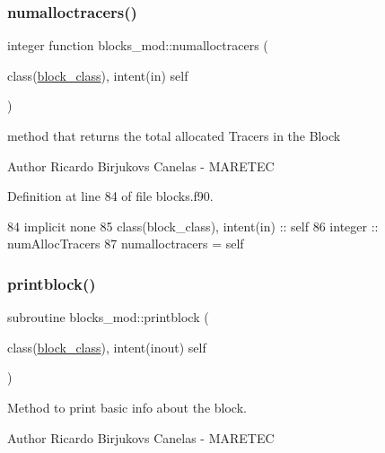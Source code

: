 \subsubsection{\texorpdfstring{numalloctracers()}{numalloctracers()}}
{\footnotesize\ttfamily integer function blocks\+\_\+mod\+::numalloctracers (\begin{DoxyParamCaption}\item[{class(\mbox{\hyperlink{structblocks__mod_1_1block__class}{block\+\_\+class}}), intent(in)}]{self }\end{DoxyParamCaption})\hspace{0.3cm}{\ttfamily [private]}}



method that returns the total allocated Tracers in the Block 

\begin{DoxyAuthor}{Author}
Ricardo Birjukovs Canelas -\/ M\+A\+R\+E\+T\+EC 
\end{DoxyAuthor}


Definition at line 84 of file blocks.\+f90.


\begin{DoxyCode}
84     \textcolor{keywordtype}{implicit none}
85     \textcolor{keywordtype}{class}(block\_class), \textcolor{keywordtype}{intent(in)} :: self
86     \textcolor{keywordtype}{integer} :: numAllocTracers
87     numalloctracers = self%
\end{DoxyCode}
\mbox{\label{namespaceblocks__mod_a6eab8b323cb15dcecb5c6b0c31b4e246}} 
\subsubsection{\texorpdfstring{printblock()}{printblock()}}
{\footnotesize\ttfamily subroutine blocks\+\_\+mod\+::printblock (\begin{DoxyParamCaption}\item[{class(\mbox{\hyperlink{structblocks__mod_1_1block__class}{block\+\_\+class}}), intent(inout)}]{self }\end{DoxyParamCaption})\hspace{0.3cm}{\ttfamily [private]}}



Method to print basic info about the block. 

\begin{DoxyAuthor}{Author}
Ricardo Birjukovs Canelas -\/ M\+A\+R\+E\+T\+EC 
\end{DoxyAuthor}

